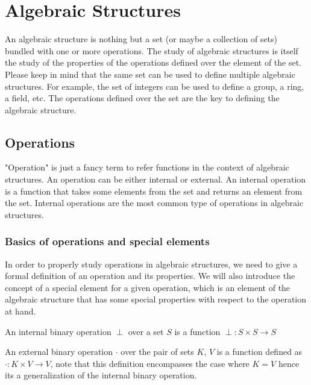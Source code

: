 \section{Algebraic Structures}

An algebraic structure is nothing but a set (or maybe a collection of sets) bundled with one or more operations. The study 
of algebraic structures is itself the study of the properties of the operations defined over the element of the set. Please keep in 
mind that the same set can be used to define multiple algebraic structures. For example, the set of integers can be used to define
a group, a ring, a field, etc. The operations defined over the set are the key to defining the algebraic structure.

\subsection{Operations}
"Operation" is just a fancy term to refer functions in the context of algebraic structures. An operation can be either 
internal or external. An internal operation is a function that takes some elements from the set and returns an element from the set. Internal 
operations are the most common type of operations in algebraic structures.

\subsubsection{Basics of operations and special elements}
In order to properly study operations in algebraic structures, we need to give a formal definition of an operation and 
its properties. We will also introduce the concept of a special element for a given operation, which is an element of the algebraic 
structure that has some special properties with respect to the operation at hand.

\begin{definition}
    An internal binary operation $\perp$ over a set $S$ is a function $\perp: S \times S \rightarrow S$
\end{definition}

\begin{definition}
    An external binary operation $\cdot$ over the pair of sets $K$, $V$ is a function defined as $\cdot: K \times V \rightarrow V$, note 
    that this definition encompasses the case where $K = V$ hence its a generalization of the internal binary operation.
\end{definition}


